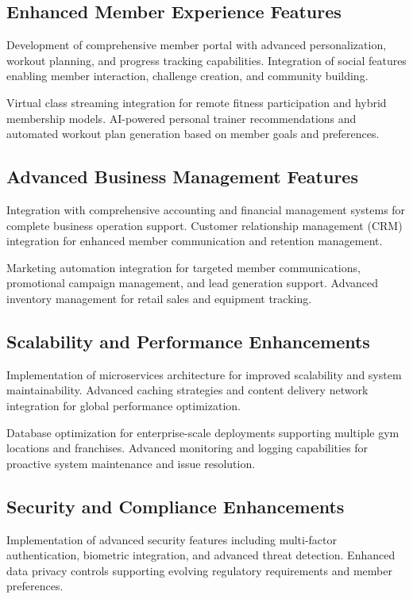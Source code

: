 \documentclass[12pt,a4paper]{report}
\begin{document}
\subsection{Enhanced Member Experience Features}

Development of comprehensive member portal with advanced personalization, workout planning, and progress tracking capabilities. Integration of social features enabling member interaction, challenge creation, and community building.

Virtual class streaming integration for remote fitness participation and hybrid membership models. AI-powered personal trainer recommendations and automated workout plan generation based on member goals and preferences.

\subsection{Advanced Business Management Features}

Integration with comprehensive accounting and financial management systems for complete business operation support. Customer relationship management (CRM) integration for enhanced member communication and retention management.

Marketing automation integration for targeted member communications, promotional campaign management, and lead generation support. Advanced inventory management for retail sales and equipment tracking.

\subsection{Scalability and Performance Enhancements}

Implementation of microservices architecture for improved scalability and system maintainability. Advanced caching strategies and content delivery network integration for global performance optimization.

Database optimization for enterprise-scale deployments supporting multiple gym locations and franchises. Advanced monitoring and logging capabilities for proactive system maintenance and issue resolution.

\subsection{Security and Compliance Enhancements}

Implementation of advanced security features including multi-factor authentication, biometric integration, and advanced threat detection. Enhanced data privacy controls supporting evolving regulatory requirements and member preferences.
\end{document}

